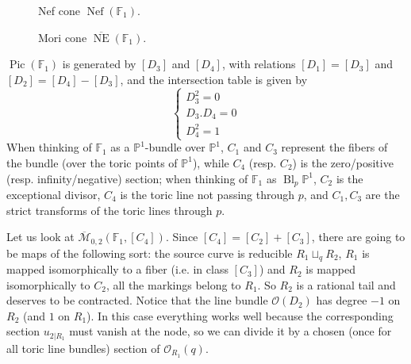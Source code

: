 \documentclass[11pt]{amsart}
\newcommand{\M}[4]{\overline{\mathcal M}_{#1,#2}(#3,#4)}
\newcommand{\PP}{\mathbb P}
\newcommand{\Pic}{\operatorname{Pic}}
\theoremstyle{plain}
\theoremstyle{definition}
\begin{document}
\begin{figure}
\caption{Nef cone $\operatorname{Nef}(\mathbb F_1)$.}
\end{figure}

\begin{figure}
\caption{Mori cone $\overline{\operatorname{NE}}(\mathbb F_1)$.}
\end{figure}

$\Pic(\mathbb F_1)$ is generated by $[D_3]$ and $[D_4]$, with relations $[D_1]=[D_3]$ and $[D_2]=[D_4]-[D_3]$, and the intersection table is given by
\[
{}
\begin{cases}
 D_3^2=0 \\
 D_3.D_4=0 \\
 D_4^2=1
\end{cases} 
\]
When thinking of $\mathbb F_1$ as a $\PP^1$-bundle over $\PP^1$, $C_1$ and $C_3$ represent the fibers of the bundle (over the toric points of $\PP^1$), while $C_4$ (resp. $C_2$) is the zero/positive (resp. infinity/negative) section; when thinking of $\mathbb F_1$ as $\operatorname{Bl}_{p}\PP^1$, $C_2$ is the exceptional divisor, $C_4$ is the toric line not passing through $p$, and $C_1,C_3$ are the strict transforms of the toric lines through $p$.

Let us look at $\M{0}{2}{\mathbb F_1}{[C_4]}$. Since $[C_4]=[C_2]+[C_3]$, there are going to be maps of the following sort: the source curve is reducible $R_1\sqcup_q R_2$, $R_1$ is mapped isomorphically to a fiber (i.e. in class $[C_3]$) and $R_2$ is mapped isomorphically to $C_2$, all the markings belong to $R_1$. So $R_2$ is a rational tail and deserves to be contracted. Notice that the line bundle $\mathcal O(D_2)$ has degree $-1$ on $R_2$ (and $1$ on $R_1$). In this case everything works well because the corresponding section $u_{2|R_1}$ must vanish at the node, so we can divide it by a chosen (once for all toric line bundles) section of $\mathcal O_{R_1}(q)$.
\end{document}
